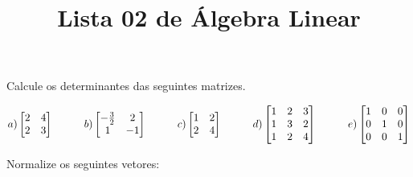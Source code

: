 \documentclass[12pt]{exam}
\title{Lista 02 de Álgebra Linear}
\date{}
\begin{document}
\maketitle


\vspace{3em}


\begin{questions}

    \question Calcule os determinantes 
    das seguintes matrizes.
    
        \[ 
            a)
            \begin{bmatrix}
            2 & 4\\
            2 & 3
            \end{bmatrix}
            \hspace{.4in}
            b)
            \begin{bmatrix}
            -\frac{3}{2} & 2\\
            1 & -1
            \end{bmatrix}
            \hspace{.4in}
            c)
            \begin{bmatrix}
            1 & 2\\
            2 & 4
            \end{bmatrix}
            \hspace{.4in}
            d)
            \begin{bmatrix}
            1 & 2 & 3\\
            1 & 3 & 2\\
            1 & 2 & 4
            \end{bmatrix}
            \hspace{.4in}
            e)
            \begin{bmatrix}
            1 & 0 & 0\\
            0 & 1 & 0\\
            0 & 0 & 1
            \end{bmatrix}
        \]

    \question Normalize os seguintes vetores:
\end{questions}
\end{document}
